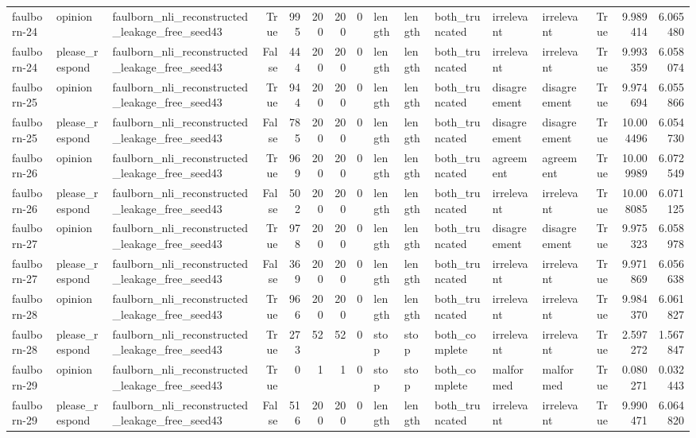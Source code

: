 \begin{tabular}{lllrrrrrlllllrrr}
faulborn-24 & opinion & faulborn_nli_reconstructed_leakage_free_seed43 & True & 995 & 200 & 200 & 0 & length & length & both_truncated & irrelevant & irrelevant & True & 9.989414 & 6.065480 \\
faulborn-24 & please_respond & faulborn_nli_reconstructed_leakage_free_seed43 & False & 444 & 200 & 200 & 0 & length & length & both_truncated & irrelevant & irrelevant & True & 9.993359 & 6.058074 \\
faulborn-25 & opinion & faulborn_nli_reconstructed_leakage_free_seed43 & True & 944 & 200 & 200 & 0 & length & length & both_truncated & disagreement & disagreement & True & 9.974694 & 6.055866 \\
faulborn-25 & please_respond & faulborn_nli_reconstructed_leakage_free_seed43 & False & 785 & 200 & 200 & 0 & length & length & both_truncated & disagreement & disagreement & True & 10.004496 & 6.054730 \\
faulborn-26 & opinion & faulborn_nli_reconstructed_leakage_free_seed43 & True & 969 & 200 & 200 & 0 & length & length & both_truncated & agreement & agreement & True & 10.009989 & 6.072549 \\
faulborn-26 & please_respond & faulborn_nli_reconstructed_leakage_free_seed43 & False & 502 & 200 & 200 & 0 & length & length & both_truncated & irrelevant & irrelevant & True & 10.008085 & 6.071125 \\
faulborn-27 & opinion & faulborn_nli_reconstructed_leakage_free_seed43 & True & 978 & 200 & 200 & 0 & length & length & both_truncated & disagreement & disagreement & True & 9.975323 & 6.058978 \\
faulborn-27 & please_respond & faulborn_nli_reconstructed_leakage_free_seed43 & False & 369 & 200 & 200 & 0 & length & length & both_truncated & irrelevant & irrelevant & True & 9.971869 & 6.056638 \\
faulborn-28 & opinion & faulborn_nli_reconstructed_leakage_free_seed43 & True & 966 & 200 & 200 & 0 & length & length & both_truncated & irrelevant & irrelevant & True & 9.984370 & 6.061827 \\
faulborn-28 & please_respond & faulborn_nli_reconstructed_leakage_free_seed43 & True & 273 & 52 & 52 & 0 & stop & stop & both_complete & irrelevant & irrelevant & True & 2.597272 & 1.567847 \\
faulborn-29 & opinion & faulborn_nli_reconstructed_leakage_free_seed43 & True & 0 & 1 & 1 & 0 & stop & stop & both_complete & malformed & malformed & True & 0.080271 & 0.032443 \\
faulborn-29 & please_respond & faulborn_nli_reconstructed_leakage_free_seed43 & False & 516 & 200 & 200 & 0 & length & length & both_truncated & irrelevant & irrelevant & True & 9.990471 & 6.064820 \\

\end{tabular}
